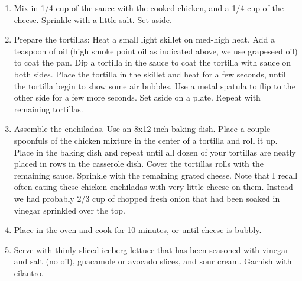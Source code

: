 \documentclass[11pt, twoside, openany]{book}
\begin{document}
\begin{minipage}[t]{\linewidth}
\begin{enumerate}
\item Mix in 1/4 cup of the sauce with the cooked chicken, and a 1/4 cup of the cheese. Sprinkle with a little salt. Set aside.
\item Prepare the tortillas: Heat a small light skillet on med-high heat. Add a teaspoon of oil (high smoke point oil as indicated above, we use grapeseed oil) to coat the pan. Dip a tortilla in the sauce to coat the tortilla with sauce on both sides. Place the tortilla in the skillet and heat for a few seconds, until the tortilla begin to show some air bubbles. Use a metal spatula to flip to the other side for a few more seconds. Set aside on a plate. Repeat with remaining tortillas.
\item Assemble the enchiladas. Use an 8x12 inch baking dish. Place a couple spoonfuls of the chicken mixture in the center of a tortilla and roll it up. Place in the baking dish and repeat until all dozen of your tortillas are neatly placed in rows in the casserole dish. Cover the tortillas rolls with the remaining sauce. Sprinkle with the remaining grated cheese. Note that I recall often eating these chicken enchiladas with very little cheese on them. Instead we had probably 2/3 cup of chopped fresh onion that had been soaked in vinegar sprinkled over the top.
\item Place in the oven and cook for 10 minutes, or until cheese is bubbly.
\item Serve with thinly sliced iceberg lettuce that has been seasoned with vinegar and salt (no oil), guacamole or avocado slices, and sour cream. Garnish with cilantro.
\end{enumerate}
\end{minipage}\vspace{8mm}
\end{document}
